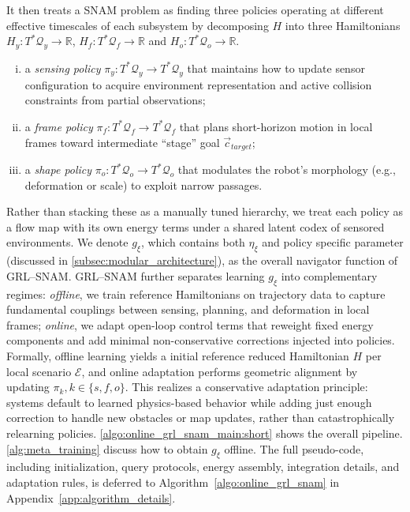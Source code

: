 It then treats a SNAM problem as finding three policies operating at different effective timescales of each subsystem by decomposing $H$ into three Hamiltonians $H_y:T^{*}\mathcal{Q}_y\rightarrow \mathbb{R}$, $H_f:T^{*}\mathcal{Q}_f\rightarrow \mathbb{R}$ and $H_o:T^{*}\mathcal{Q}_o\rightarrow \mathbb{R}$. 
 \begin{enumerate}[i.)]
     \item a {\emph{sensing policy}} $\pi_y: T^*\mathcal{Q}_y\to T^*
\mathcal{Q}_y$ that maintains how to update sensor configuration to acquire environment representation and active collision constraints from partial observations;
     \item a \emph{frame policy} $\pi_f:  T^*\mathcal{Q}_f\to T^*
\mathcal{Q}_f$ that plans short-horizon motion in local frames toward intermediate “stage” goal $\vec{c}_{target}$;
     \item a \emph{shape policy} $\pi_o: T^*\mathcal{Q}_o\to T^*\mathcal{Q}_o$ that modulates the robot’s morphology (e.g., deformation or scale) to exploit narrow passages.
 \end{enumerate}
 Rather than stacking these as a manually tuned hierarchy, we treat each policy as a flow map with its own energy terms under a shared latent codex of sensored environments. We denote $g_{\xi}$, which contains both $\eta_{\xi}$ and policy specific parameter (discussed in \cref{subsec:modular_architecture}), as the overall navigator function of GRL--SNAM. GRL--SNAM further separates learning $g_{\xi}$ into complementary regimes: \emph{offline}, we train reference Hamiltonians on trajectory data to capture fundamental couplings between sensing, planning, and deformation in local frames;
\emph{online}, we adapt open-loop control terms that reweight fixed energy components and add minimal non-conservative corrections injected into policies. Formally, offline learning yields a initial reference reduced Hamiltonian $H$ per local scenario $\mathcal{E}$, and online adaptation performs geometric alignment by updating $\pi_k,k\in\{s,f,o\}$. This realizes a conservative adaptation principle: systems default to learned physics-based behavior while adding just enough correction to handle new obstacles or map updates, rather than catastrophically relearning policies. \cref{algo:online_grl_snam_main:short} shows the overall pipeline. \cref{alg:meta_training} discuss how to obtain $g_{\xi}$ offline. The full pseudo-code, including initialization, query protocols, energy assembly, integration details, and adaptation rules, is deferred to Algorithm~\ref{algo:online_grl_snam} in Appendix~\ref{app:algorithm_details}.


